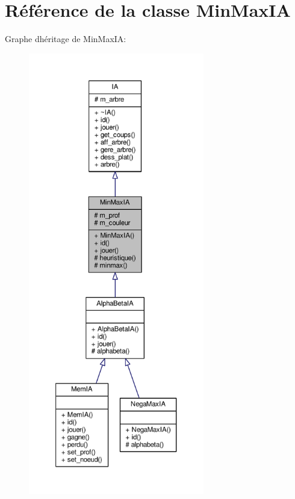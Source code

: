 \hypertarget{classMinMaxIA}{}\section{Référence de la classe Min\+Max\+IA}
\label{classMinMaxIA}


Graphe d\textquotesingle{}héritage de Min\+Max\+IA\+:\nopagebreak
\begin{figure}[H]
\begin{center}
\leavevmode
\includegraphics[height=550pt]{classMinMaxIA__inherit__graph}
\end{center}
\end{figure}


